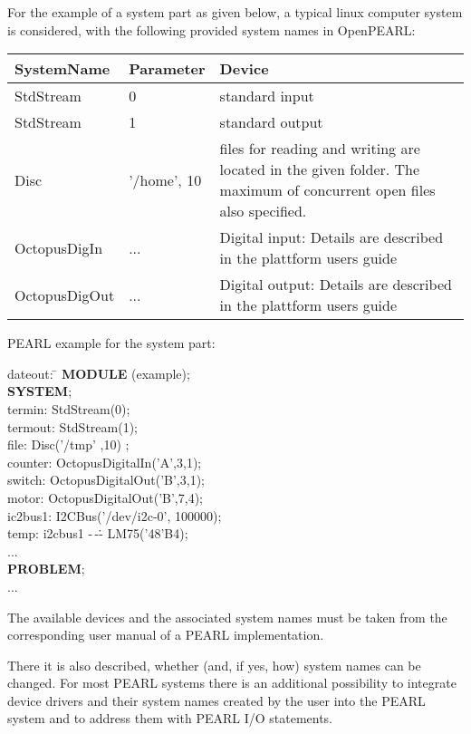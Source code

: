 \begin{added}

For the example of a system part as given below, a typical linux computer
system is considered, with the following provided system names in OpenPEARL:

\begin{tabular}{ll@{\x}p{6cm}}
SystemName & Parameter & Device \\ \hline
StdStream  &  0 & standard input \\
StdStream  &  1 & standard output \\
Disc       & '/home', 10 & files for reading and writing are located in the given folder. The maximum of concurrent open files also specified. \\
OctopusDigIn & ... & Digital input: Details are described in 
		the plattform users guide \\
OctopusDigOut & ... & Digital output: Details are described in 
		the plattform users guide \\
\end{tabular}

PEARL example for the system part:

\begin{tabbing}
\x dateout: \= \kill
{\bf MODULE} (example); \> \\
{\bf SYSTEM}; \> \\
\x termin:  \> StdStream(0); \\
\x termout: \> StdStream(1);\\
\x file:    \> Disc('/tmp' ,10) ;  \\
\x counter: \> OctopusDigitalIn('A',3,1); \\
\x switch:  \> OctopusDigitalOut('B',3,1); \\
\x motor:   \> OctopusDigitalOut('B',7,4); \\
\x ic2bus1: \> I2CBus('/dev/i2c-0', 100000);\\
\x temp:    \> i2cbus1 -\,-\.- LM75('48'B4); \\
\x ... \> \\
{\bf PROBLEM};\> \\
\x ... \>
\end{tabbing}

\end{added}

The available devices and the associated system names must be taken from
the corresponding user manual of a PEARL implementation.
\begin{removed} There it is
also described, whether (and, if yes, how) system names can be changed.
For most PEARL systems there is an additional possibility to integrate
device drivers and their system names created by the user into the PEARL
system and to address them with PEARL I/O statements.
\end{removed} 

